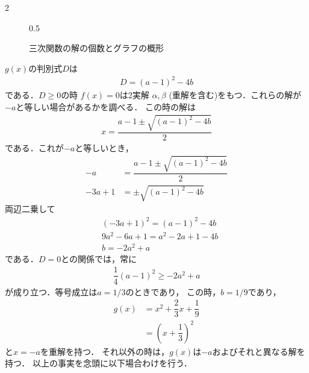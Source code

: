 \documentclass[../../main.tex]{subfiles}
\begin{document}
\begin{multicols}{2}
\begin{figure}[H]
\begin{subcaptionblock}{0.5\linewidth}
    \end{subcaptionblock}
    \caption{三次関数の解の個数とグラフの概形}
    \label{2000-1:fig:1}
  \end{figure}

  $g(x)$の判別式$D$は
  \begin{align}
    D=(a-1)^2-4b
  \end{align}
  である．$D\ge0$の時 $f(x)=0$は2実解 $\alpha, \beta$ (重解を含む)をもつ．これらの解が$-a$と等しい場合があるかを調べる．
  この時の解は
  \begin{align}
    x = \dfrac{a-1 \pm \sqrt{(a-1)^2-4b}}{2}\label{eq:1}
  \end{align}
  である．これが$-a$と等しいとき，
  \begin{align}
    -a      & = \dfrac{a-1 \pm \sqrt{(a-1)^2-4b}}{2} \\
    -3a + 1 & = \pm \sqrt{(a-1)^2-4b}
  \end{align}
  両辺二乗して
  \begin{align}
    & (-3a+1)^2 = (a-1)^2-4b   \nonumber \\
    & 9a^2-6a+1 = a^2-2a+1 -4b \nonumber \\
    & b = - 2a^2+a \label{eq:2}
  \end{align}
  である．$D=0$との関係では，常に
  \begin{align}
    \dfrac{1}{4}(a-1)^2 \ge -2a^2+a
  \end{align}
  が成り立つ．等号成立は$a=1/3$のときであり，
  この時，$b=1/9$であり，
  \begin{align}
    g(x)
    & = x^2+\dfrac{2}{3}x+\dfrac{1}{9} \\
    & = \left(x+\dfrac{1}{3}\right)^2
  \end{align}
  と$x=-a$を重解を持つ．
  それ以外の時は，$g(x)$は$-a$およびそれと異なる解を持つ．
  以上の事実を念頭に以下場合わけを行う．


\end{multicols}
\end{document}
